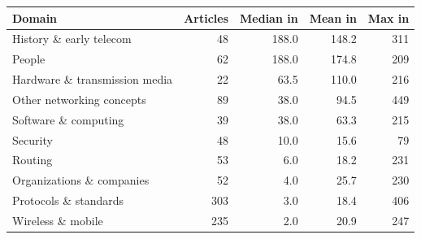 
\begin{tabular}{lrrrr}
\toprule
Domain & Articles & Median in & Mean in & Max in\\
\midrule
History \& early telecom & 48 & 188.0 & 148.2 & 311\\
People & 62 & 188.0 & 174.8 & 209\\
Hardware \& transmission media & 22 & 63.5 & 110.0 & 216\\
Other networking concepts & 89 & 38.0 & 94.5 & 449\\
Software \& computing & 39 & 38.0 & 63.3 & 215\\
Security & 48 & 10.0 & 15.6 & 79\\
Routing & 53 & 6.0 & 18.2 & 231\\
Organizations \& companies & 52 & 4.0 & 25.7 & 230\\
Protocols \& standards & 303 & 3.0 & 18.4 & 406\\
Wireless \& mobile & 235 & 2.0 & 20.9 & 247\\
\bottomrule
\end{tabular}
